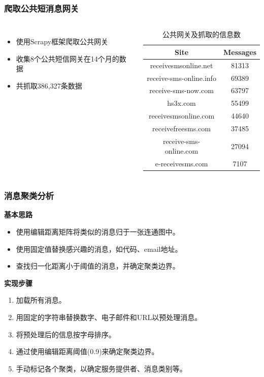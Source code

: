 \documentclass{beamer}
\begin{document}
\begin{frame}
\frametitle{\textbf{爬取公共短消息网关}}
\begin{columns}
\footnotesize
\begin{itemize}
    \item 使用Scrapy框架爬取公共网关
    \item 收集8个公共短信网关在14个月的数据
    \item 共抓取386,327条数据
\end{itemize}

\begin{table}
\caption{公共网关及抓取的信息数}
\label{table1:gateways}
\centering
\footnotesize
\begin{tabular}{|c|c|}
\hline
\textbf{Site}           & \textbf{Messages}\\
\hline
receivesmsonline.net    &81313\\
\hline
receive-sms-online.info &69389\\
\hline
receive-sms-now.com     &63797\\
\hline
    hs3x.com               &55499\\
\hline
receivesmsonline.com    &44640\\
\hline
receivefreesms.com      &37485\\
\hline
receive-sms-online.com  &27094\\
\hline
    e-receivesms.com       &7107\\
\hline
\end{tabular}
\end{table}
\end{columns}

\end{frame}

\begin{frame}
\frametitle{\textbf{消息聚类分析}}
\begin{block}{\textbf{基本思路}}
\begin{itemize}
    \item 使用编辑距离矩阵将类似的消息归于一张连通图中。
    \item 使用固定值替换感兴趣的消息，如代码、email地址。
    \item 查找归一化距离小于阈值的消息，并确定聚类边界。
\end{itemize}
\end{block}

\begin{block}{\textbf{实现步骤}}
\begin{enumerate}
    \item 加载所有消息。
    \item 用固定的字符串替换数字、电子邮件和URL以预处理消息。
    \item 将预处理后的信息按字母排序。
    \item 通过使用编辑距离阈值(0.9)来确定聚类边界。
    \item 手动标记各个聚类，以确定服务提供者、消息类别等。
\end{enumerate}
\end{block}
\end{frame}
\end{document}
